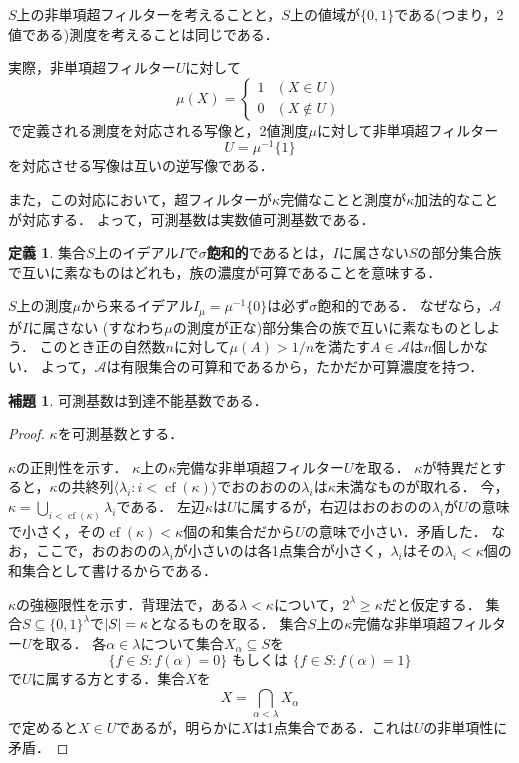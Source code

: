 \documentclass[uplatex]{jsarticle}
\newcommand{\cf}{\operatorname{cf}}
\newcommand{\seq}[1]{{\langle#1\rangle}}
\DeclarePairedDelimiter\abs{\lvert}{\rvert}
\renewcommand\subset{\subseteq}
\theoremstyle{definition}
\newtheorem{defi}[thm]{定義}
\newtheorem{lem}[thm]{補題}
\begin{document}
	$S$上の非単項超フィルターを考えることと，$S$上の値域が$\{0, 1\}$である(つまり，2値である)測度を考えることは同じである．
	
	実際，非単項超フィルター$U$に対して
	\[\mu(X) = \begin{cases}1 & (X \in U)\\ 0 & (X \not \in U) \end{cases}\]
	で定義される測度を対応される写像と，2値測度$\mu$に対して非単項超フィルター
	\[U = \mu^{-1}\{1\}\]
	を対応させる写像は互いの逆写像である．
	
	また，この対応において，超フィルターが$\kappa$完備なことと測度が$\kappa$加法的なことが対応する．
	よって，可測基数は実数値可測基数である．
	
	\begin{defi}
		集合$S$上のイデアル$I$で\textbf{$\sigma$飽和的}であるとは，$I$に属さない$S$の部分集合族で互いに素なものはどれも，族の濃度が可算であることを意味する．
	\end{defi}
	
	$S$上の測度$\mu$から来るイデアル$I_\mu = \mu^{-1}\{0\}$は必ず$\sigma$飽和的である．
	なぜなら，$\mathcal{A}$が$I$に属さない (すなわち$\mu$の測度が正な)部分集合の族で互いに素なものとしよう．
	このとき正の自然数$n$に対して$\mu(A) > 1/n$を満たす$A \in \mathcal{A}$は$n$個しかない．
	よって，$\mathcal{A}$は有限集合の可算和であるから，たかだか可算濃度を持つ．
	
	\begin{lem}\label{lem:measisinacc}
		可測基数は到達不能基数である．
	\end{lem}
	\begin{proof}
		$\kappa$を可測基数とする．
		
		$\kappa$の正則性を示す．
		$\kappa$上の$\kappa$完備な非単項超フィルター$U$を取る．
		$\kappa$が特異だとすると，$\kappa$の共終列$\seq{\lambda_i : i < \cf(\kappa) }$でおのおのの$\lambda_i$は$\kappa$未満なものが取れる．
		今，$\kappa = \bigcup_{i < \cf(\kappa)} \lambda_i$である．
		左辺$\kappa$は$U$に属するが，右辺はおのおのの$\lambda_i$が$U$の意味で小さく，その$\cf(\kappa) < \kappa$個の和集合だから$U$の意味で小さい．矛盾した．
		なお，ここで，おのおのの$\lambda_i$が小さいのは各1点集合が小さく，$\lambda_i$はその$\lambda_i < \kappa$個の和集合として書けるからである．
		
		$\kappa$の強極限性を示す．背理法で，ある$\lambda < \kappa$について，$2^\lambda \ge \kappa$だと仮定する．
		集合$S \subset \{0, 1\}^\lambda$で$\abs{S} = \kappa$となるものを取る．
		集合$S$上の$\kappa$完備な非単項超フィルター$U$を取る．
		各$\alpha \in \lambda$について集合$X_\alpha \subset S$を
		\[
		\{ f \in S : f(\alpha) = 0 \} \text{ もしくは } \{ f \in S : f(\alpha) = 1 \}
		\]
		で$U$に属する方とする．集合$X$を
		\[
		X = \bigcap_{\alpha < \lambda} X_\alpha
		\]
		で定めると$X \in U$であるが，明らかに$X$は1点集合である．これは$U$の非単項性に矛盾．
	\end{proof}
	
\end{document}
